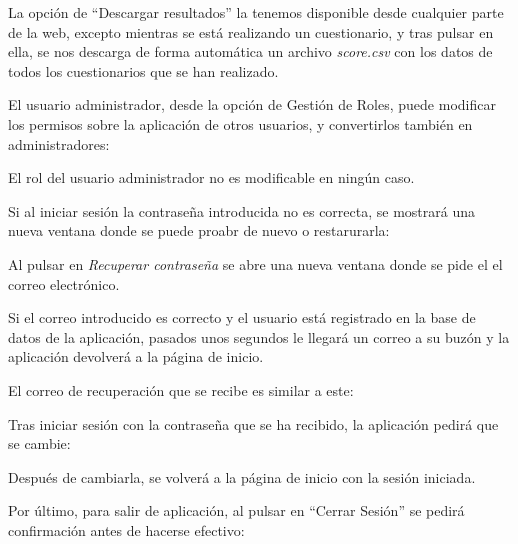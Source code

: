 
La opción de ``Descargar resultados'' la tenemos disponible desde cualquier parte de la web, excepto mientras se está realizando un cuestionario, y tras pulsar en ella, se nos descarga de forma automática un archivo \textit{score.csv} con los datos de todos los cuestionarios que se han realizado.


El usuario administrador, desde la opción de Gestión de Roles, puede modificar los permisos sobre la aplicación de otros usuarios, y convertirlos también en administradores:


El rol del usuario administrador no es modificable en ningún caso.

Si al iniciar sesión la contraseña introducida no es correcta, se mostrará una nueva ventana donde se puede proabr de nuevo o restarurarla:


Al pulsar en \textit{Recuperar contraseña} se abre una nueva ventana donde se pide el el correo electrónico.

Si el correo introducido es correcto y el usuario está registrado en la base de datos de la aplicación, pasados unos segundos le llegará un correo a su buzón y la aplicación devolverá a la página de inicio.

El correo de recuperación que se recibe es similar a este:

Tras iniciar sesión con la contraseña que se ha recibido, la aplicación pedirá que se cambie:

Después de cambiarla, se volverá a la página de inicio con la sesión iniciada.

\clearpage
Por último, para salir de aplicación, al pulsar en ``Cerrar Sesión'' se pedirá confirmación antes de hacerse efectivo:






